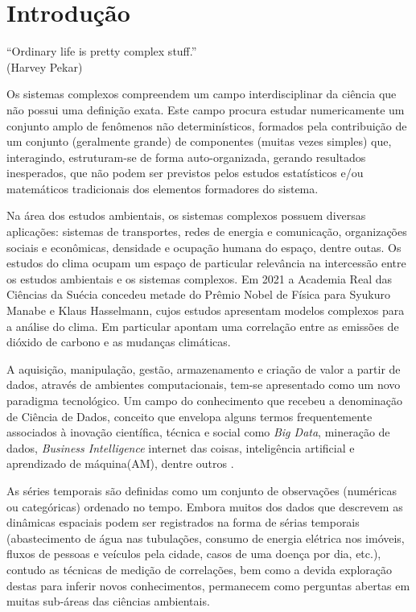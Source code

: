 \chapter{Introdução}
\label{cap:introducao}


\begin{flushright}
``Ordinary life is pretty complex stuff.''\\
(Harvey Pekar)
\end{flushright}

Os sistemas complexos compreendem um campo interdisciplinar da ciência que não possui uma definição exata. Este campo procura estudar numericamente um conjunto amplo de fenômenos não determinísticos, formados pela contribuição de um conjunto (geralmente grande) de componentes (muitas vezes simples) que, interagindo, estruturam-se de forma auto-organizada, gerando resultados inesperados, que não podem ser previstos pelos estudos estatísticos e/ou matemáticos tradicionais dos elementos formadores do sistema.

Na área dos estudos ambientais, os sistemas complexos possuem diversas aplicações: sistemas de transportes, redes de energia e comunicação, organizações sociais e econômicas, densidade e ocupação humana do espaço, dentre outas. Os estudos do clima ocupam um espaço de particular relevância na intercessão entre os estudos ambientais e os sistemas complexos. Em 2021 a Academia Real das Ciências da Suécia concedeu metade do Prêmio Nobel de Física para Syukuro Manabe e Klaus Hasselmann, cujos estudos apresentam modelos complexos para a análise do clima. Em particular apontam uma correlação entre as emissões de dióxido de carbono e as mudanças climáticas.

A aquisição, manipulação, gestão, armazenamento e criação de valor a partir de dados, através de ambientes computacionais, tem-se apresentado como um novo paradigma tecnológico. Um campo do conhecimento que recebeu a denominação de Ciência de Dados, conceito que envelopa alguns termos frequentemente associados à inovação científica, técnica e social como \emph{Big Data}, mineração de dados, \emph{Business Intelligence} internet das coisas, inteligência artificial e aprendizado de máquina(AM), dentre outros \cite[p. 12-13]{EMCdata2015}.

As séries temporais são definidas como um conjunto de observações (numéricas ou categóricas) ordenado no tempo.  Embora muitos dos dados que descrevem as dinâmicas espaciais podem ser registrados na forma de sérias temporais (abastecimento de água nas tubulações, consumo de energia elétrica nos imóveis, fluxos de pessoas e veículos pela cidade, casos de uma doença por dia, etc.), contudo as técnicas de medição de correlações, bem como a devida exploração destas para inferir novos conhecimentos, permanecem como perguntas abertas em muitas sub-áreas das ciências ambientais\cite{Bermudez-Edo2018}.


